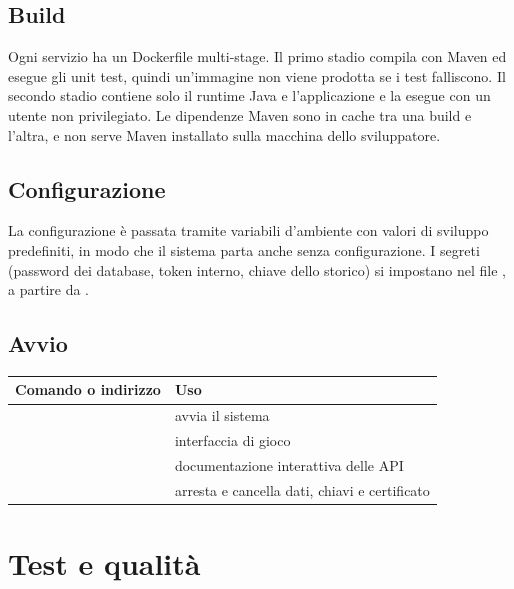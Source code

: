 \documentclass[11pt,a4paper]{report}
\begin{document}
\section{Build}

Ogni servizio ha un Dockerfile multi-stage. Il primo stadio compila con Maven ed esegue gli unit test, quindi un'immagine non viene prodotta se i test falliscono. Il secondo stadio contiene solo il runtime Java e l'applicazione e la esegue con un utente non privilegiato. Le dipendenze Maven sono in cache tra una build e l'altra, e non serve Maven installato sulla macchina dello sviluppatore.

\section{Configurazione}

La configurazione è passata tramite variabili d'ambiente con valori di sviluppo predefiniti, in modo che il sistema parta anche senza configurazione. I segreti (password dei database, token interno, chiave dello storico) si impostano nel file , a partire da .

\section{Avvio}

\begin{center}\small
\begin{tabularx}{\linewidth}{@{}P{7.4cm}L@{}}
\toprule
\textbf{Comando o indirizzo} & \textbf{Uso} \\
\midrule
{} & avvia il sistema \\
 & interfaccia di gioco \\
 & documentazione interattiva delle API \\
 & arresta e cancella dati, chiavi e certificato \\
\bottomrule
\end{tabularx}
\end{center}

\chapter{Test e qualità}
\label{ch:test}
\end{document}
